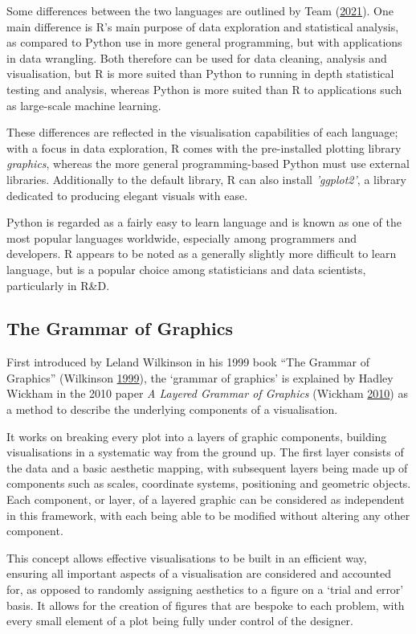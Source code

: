 \documentclass[
  11pt,
]{book}
\begin{document}
Some differences between the two languages are outlined by Team
(\protect\hyperlink{ref-rvpy}{2021}). One main difference is R's main
purpose of data exploration and statistical analysis, as compared to
Python use in more general programming, but with applications in data
wrangling. Both therefore can be used for data cleaning, analysis and
visualisation, but R is more suited than Python to running in depth
statistical testing and analysis, whereas Python is more suited than R
to applications such as large-scale machine learning.

These differences are reflected in the visualisation capabilities of
each language; with a focus in data exploration, R comes with the
pre-installed plotting library \textit{graphics}, whereas the more
general programming-based Python must use external libraries.
Additionally to the default library, R can also install
\textit{'ggplot2'}, a library dedicated to producing elegant visuals
with ease.

Python is regarded as a fairly easy to learn language and is known as
one of the most popular languages worldwide, especially among
programmers and developers. R appears to be noted as a generally
slightly more difficult to learn language, but is a popular choice among
statisticians and data scientists, particularly in R\&D.

\subsection{The Grammar of Graphics}

First introduced by Leland Wilkinson in his 1999 book ``The Grammar of
Graphics'' (Wilkinson \protect\hyperlink{ref-wilkinson2009}{1999}), the
`grammar of graphics' is explained by Hadley Wickham in the 2010 paper
\textit{A Layered Grammar of Graphics} (Wickham
\protect\hyperlink{ref-layered-grammar}{2010}) as a method to describe
the underlying components of a visualisation.

It works on breaking every plot into a layers of graphic components,
building visualisations in a systematic way from the ground up. The
first layer consists of the data and a basic aesthetic mapping, with
subsequent layers being made up of components such as scales, coordinate
systems, positioning and geometric objects. Each component, or layer, of
a layered graphic can be considered as independent in this framework,
with each being able to be modified without altering any other
component.

This concept allows effective visualisations to be built in an efficient
way, ensuring all important aspects of a visualisation are considered
and accounted for, as opposed to randomly assigning aesthetics to a
figure on a `trial and error' basis. It allows for the creation of
figures that are bespoke to each problem, with every small element of a
plot being fully under control of the designer.
\end{document}
